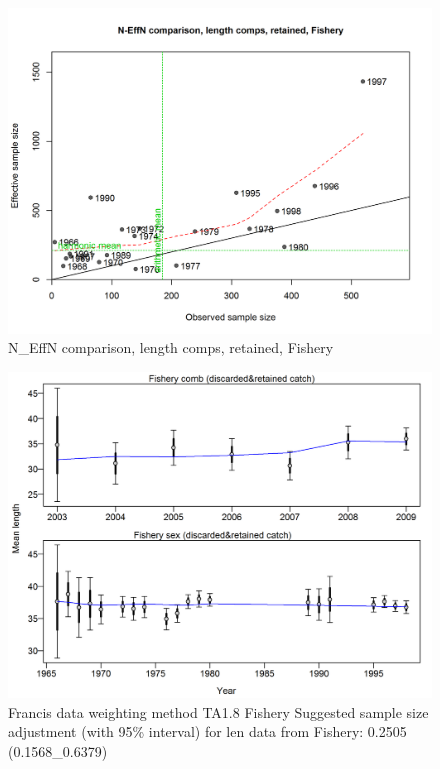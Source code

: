 \documentclass[12pt,]{article}
\begin{document}
\begin{figure}
\centering
\includegraphics{./r4ss/plots_mod1/comp_lenfit_sampsize_flt1mkt2.png}
\caption{N\_EffN comparison, length comps, retained, Fishery
\label{fig:mod1_7_comp_lenfit_sampsize_flt1mkt2}}
\end{figure}

\begin{figure}
\centering
\includegraphics{./r4ss/plots_mod1/comp_lenfit_data_weighting_TA1.8_Fishery.png}
\caption{Francis data weighting method TA1.8 Fishery Suggested sample
size adjustment (with 95\% interval) for len data from Fishery: 0.2505
(0.1568\_0.6379)
\label{fig:mod1_8_comp_lenfit_data_weighting_TA1.8_Fishery}}
\end{figure}
\end{document}
